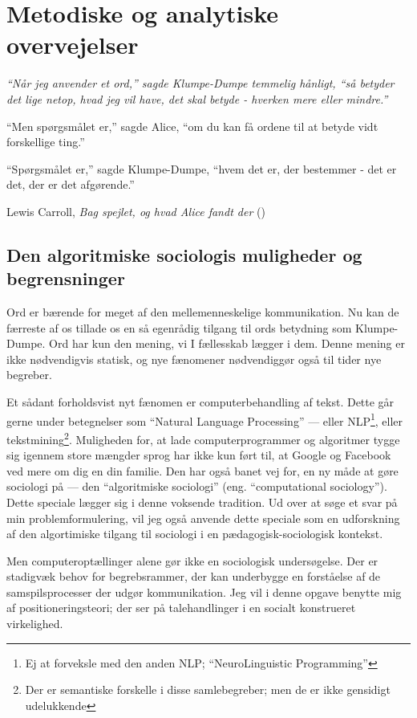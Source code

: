 \part{Metodiske og analytiske overvejelser}\label{part:method}

\epigraph{\itshape
“Når jeg anvender et ord,” sagde Klumpe-Dumpe temmelig hånligt, “så betyder det lige netop, hvad jeg vil have, det skal betyde - hverken mere eller mindre.”

“Men spørgsmålet er,” sagde Alice, “om du kan få ordene til at betyde vidt forskellige ting.”

“Spørgsmålet er,” sagde Klumpe-Dumpe, “hvem det er, der bestemmer - det er det, der er det afgørende.”
}{Lewis Carroll, \textit{Bag spejlet, og hvad Alice fandt der} (\citeyear{carrollAliceEventyrlandOg1977})}

\chapter{Den algoritmiske sociologis muligheder og begrensninger}

Ord er bærende for meget af den mellemenneskelige kommunikation.
Nu kan de færreste af os tillade os en så egenrådig tilgang til ords betydning som Klumpe-Dumpe.
Ord har kun den mening, vi I fællesskab lægger i dem.
Denne mening er ikke nødvendigvis statisk, og nye fænomener nødvendiggør også til tider nye begreber.


Et sådant forholdsvist nyt fænomen er computerbehandling af tekst.
Dette går gerne under betegnelser som “Natural Language Processing” — eller NLP\footnote{Ej at forveksle med den anden NLP; “NeuroLinguistic Programming”}, eller tekstmining\footnote{Der er semantiske forskelle i disse samlebegreber; men de er ikke gensidigt udelukkende}.
Muligheden for, at lade computerprogrammer og algoritmer tygge sig igennem store mængder sprog har ikke kun ført til, at Google og Facebook ved mere om dig en din familie.
Den har også banet vej for, en ny måde at gøre sociologi på — den “algoritmiske sociologi” (eng. “computational sociology”).
Dette speciale lægger sig i denne voksende tradition.
Ud over at søge et svar på min problemformulering, vil jeg også anvende dette speciale som en udforskning af den algortimiske tilgang til sociologi i en pædagogisk-sociologisk kontekst.

Men computeroptællinger alene gør ikke en sociologisk undersøgelse.
Der er stadigvæk behov for begrebsrammer, der kan underbygge en forståelse af de samspilsprocesser der udgør kommunikation.
Jeg vil i denne opgave benytte mig af positioneringsteori; der ser på talehandlinger i en socialt konstrueret virkelighed.

